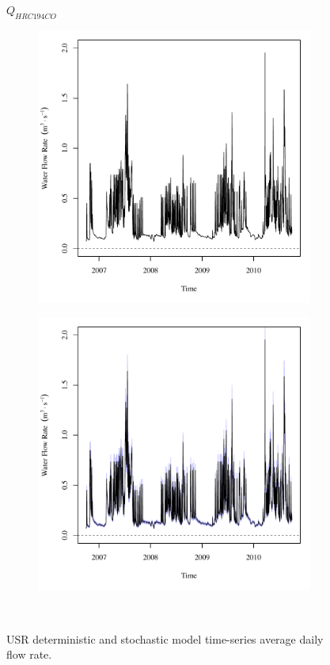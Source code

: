 \subfiguremid
\begin{landscape}
	\begin{figure}
		\centering
		$ Q_{HRC194CO} $
		\begin{subfigure}{0.7\textwidth}
			\centering
			\includegraphics[width=\tableCustomSize]{"Figures/Results_USR/Deterministic/Q HRC"}
		\end{subfigure}%
		\begin{subfigure}{0.7\textwidth}
			\centering
			\includegraphics[width=\tableCustomSize]{"Figures/Results_USR/Stochastic/Q HRC"}
		\end{subfigure}\\
		\caption{USR deterministic and stochastic model time-series average daily flow rate.}
	\end{figure}
\end{landscape}
